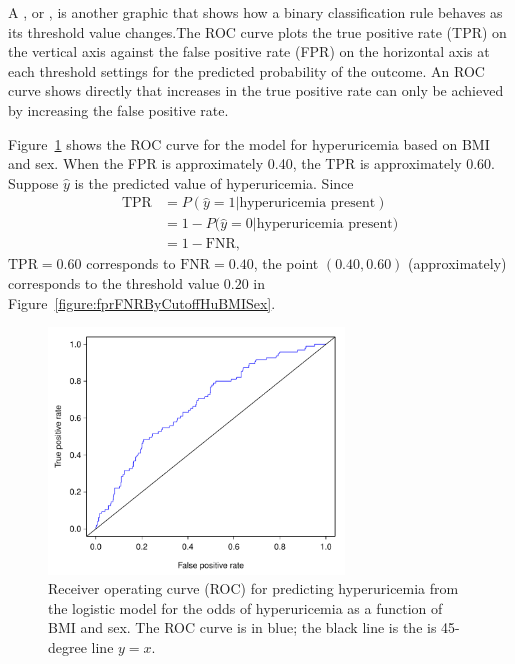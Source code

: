 A , or , is another graphic that shows how a binary classification rule behaves as its threshold value changes.The ROC curve plots the true positive rate (TPR) on the vertical axis against the false positive rate (FPR) on the horizontal axis at each threshold settings for the predicted probability of the outcome. An ROC curve shows directly that increases in the true positive rate can only be achieved by increasing the false positive rate. 

Figure~\ref{figure:ROCHuBMISex} shows the ROC curve for the model for hyperuricemia based on BMI and sex.  When the FPR is approximately 0.40, the TPR is approximately 0.60. Suppose $\hat{y}$ is the predicted value of hyperuricemia.  Since 
\begin{align*}
  \text{TPR} &= P(\hat{y} = 1| \text{hyperuricemia present}) \\
     &= 1 - P(\hat{y} =  0 | \text{hyperuricemia present)} \\
     &= 1 - \text{FNR},
\end{align*}
$\text{TPR} = 0.60$ corresponds to $\text{FNR} = 0.40$, the point $(0.40, 0.60)$ (approximately) corresponds to the threshold value $0.20$ in Figure~\ref{figure:fprFNRByCutoffHuBMISex}.


\begin{figure}[!tbh]
  \centering
  \includegraphics[width=0.70\textwidth]
  {ch_logistic_regression_oi_biostat/figures/ROCHuBMISex/ROCHuBMISex.pdf}
    \caption{Receiver operating curve (ROC) for predicting hyperuricemia from the logistic model for the odds of hyperuricemia as a function of BMI and sex. The ROC curve is in blue; the black line is the is 45-degree line $y = x$.}
    \label{figure:ROCHuBMISex}
\end{figure}

